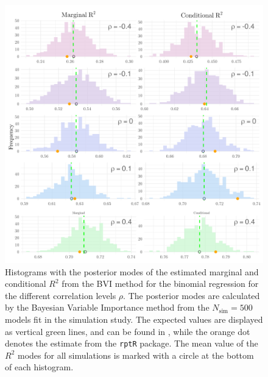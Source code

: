 \begin{figure}[H]
  \centering
  \includegraphics[width=1\linewidth]{Figures/Simulation study/R2_combined_logit.png}
  \caption[Marginal and conditional $R^2$ in binomial GLMM]{Histograms with the posterior modes of the estimated marginal and conditional $R^2$ from the BVI method for the binomial regression for the different correlation levels $\rho$. The posterior modes are calculated by the Bayesian Variable Importance method from the $N_{\text{sim}}=500$ models fit in the simulation study. The expected values are displayed as vertical green lines, and can be found in , while the orange dot denotes the estimate from the \texttt{rptR} package. The mean value of the $R^2$ modes for all simulations is marked with a circle at the bottom of each histogram.}
  \label{fig:r2_combined_logit}
\end{figure}
